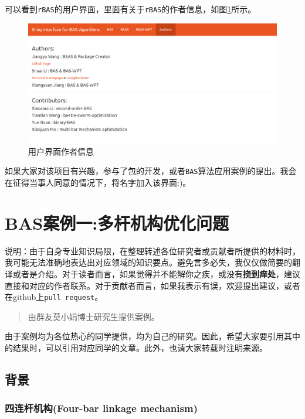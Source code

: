 \documentclass[]{ctexbook}
\theoremstyle{definition}
\theoremstyle{definition}
\theoremstyle{definition}
\theoremstyle{remark}
\begin{document}
可以看到\texttt{rBAS}的用户界面，里面有关于\texttt{rBAS}的作者信息，如图\ref{fig:author}所示。

\begin{figure}

{\centering \includegraphics[width=1\linewidth]{img/author} 

}

\caption{用户界面作者信息}\label{fig:author}
\end{figure}

如果大家对该项目有兴趣，参与了包的开发，或者\texttt{BAS}算法应用案例的提出。我会在征得当事人同意的情况下，将名字加入该界面:)。

\chapter{BAS案例一:多杆机构优化问题}\label{examples}

说明：由于自身专业知识局限，在整理转述各位研究者或贡献者所提供的材料时，我可能无法准确地表达出对应领域的知识要点。避免言多必失，我仅仅做简要的翻译或者是介绍。对于读者而言，如果觉得并不能解你之疾，或没有\textbf{挠到痒处}，建议直接和对应的作者联系。对于贡献者而言，如果我表示有误，欢迎提出建议，或者在github上\texttt{pull\ request}。

\begin{quote}
由群友莫小娟博士研究生提供案例。
\end{quote}

由于案例均为各位热心的同学提供，均为自己的研究。因此，希望大家要引用其中的结果时，可以引用对应同学的文章。此外，也请大家转载时注明来源。

\section{背景}

\subsection{四连杆机构(Four-bar linkage mechanism)}\label{bars4}
\end{document}
